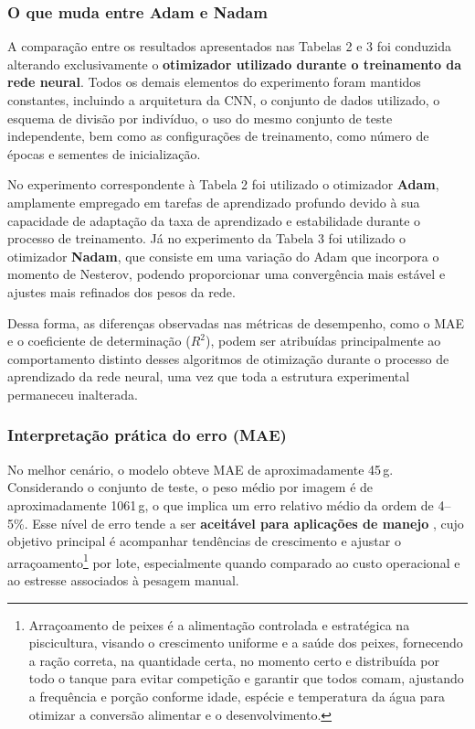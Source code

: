 \documentclass[sigconf,nonacm,screen]{acmart}
\begin{document}
\subsubsection{O que muda entre Adam e Nadam}

A comparação entre os resultados apresentados nas Tabelas 2 e 3 foi conduzida alterando exclusivamente o \textbf{otimizador utilizado durante o treinamento da rede neural}. Todos os demais elementos do experimento foram mantidos constantes, incluindo a arquitetura da CNN, o conjunto de dados utilizado, o esquema de divisão por indivíduo, o uso do mesmo conjunto de teste independente, bem como as configurações de treinamento, como número de épocas e sementes de inicialização.

No experimento correspondente à Tabela 2 foi utilizado o otimizador \textbf{Adam}, amplamente empregado em tarefas de aprendizado profundo devido à sua capacidade de adaptação da taxa de aprendizado e estabilidade durante o processo de treinamento. Já no experimento da Tabela 3 foi utilizado o otimizador \textbf{Nadam}, que consiste em uma variação do Adam que incorpora o momento de Nesterov, podendo proporcionar uma convergência mais estável e ajustes mais refinados dos pesos da rede.

Dessa forma, as diferenças observadas nas métricas de desempenho, como o MAE e o coeficiente de determinação ($R^2$), podem ser atribuídas principalmente ao comportamento distinto desses algoritmos de otimização durante o processo de aprendizado da rede neural, uma vez que toda a estrutura experimental permaneceu inalterada.

\subsubsection{Interpretação prática do erro (MAE)}
No melhor cenário, o modelo obteve MAE de aproximadamente 45\,g. Considerando o conjunto de teste, o peso médio por imagem é de aproximadamente 1061\,g, o que implica um erro relativo médio da ordem de 4--5\%. Esse nível de erro tende a ser \textbf{aceitável para aplicações de manejo} \cite{Ma2024}, cujo objetivo principal é acompanhar tendências de crescimento e ajustar o arraçoamento\footnote{Arraçoamento de peixes é a alimentação controlada e estratégica na piscicultura, visando o crescimento uniforme e a saúde dos peixes, fornecendo a ração correta, na quantidade certa, no momento certo e distribuída por todo o tanque para evitar competição e garantir que todos comam, ajustando a frequência e porção conforme idade, espécie e temperatura da água para otimizar a conversão alimentar e o desenvolvimento.} por lote, especialmente quando comparado ao custo operacional e ao estresse associados à pesagem manual.
\end{document}
